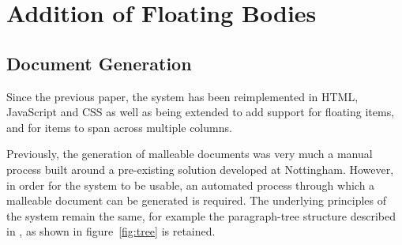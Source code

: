 \cleardoublepage
\chapter{Addition of Floating Bodies}\label{ch:floats}

% 


\section{Document Generation}
\label{sec:docgen}


Since the previous paper, the system has been reimplemented in HTML, JavaScript and CSS as well as being extended to add support for floating items, and for items to span across multiple columns. 

Previously, the generation of malleable documents was very much a manual process built around a pre-existing solution developed at Nottingham. However, in order for the system to be usable, an automated process through which a malleable document can be generated is required. The underlying principles of the system remain the same, for example the paragraph-tree structure described in \cite{Pinkney2011}, as shown in figure~\ref{fig:tree} is retained. 








